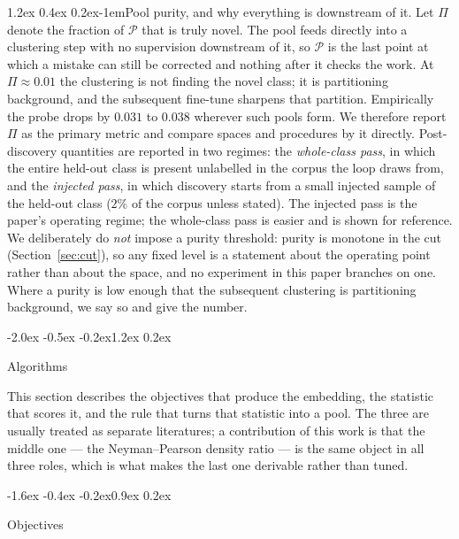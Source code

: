 \documentclass{article}
\makeatletter
\renewcommand\section{\@startsection{section}{1}{\z@}%
  {-2.0ex \@plus -0.5ex \@minus -0.2ex}{1.2ex \@plus 0.2ex}%
  {\large\bf\raggedright}}
\renewcommand\subsection{\@startsection{subsection}{2}{\z@}%
  {-1.6ex \@plus -0.4ex \@minus -0.2ex}{0.9ex \@plus 0.2ex}%
  {\normalsize\bf\raggedright}}
\renewcommand\paragraph{\@startsection{paragraph}{4}{\z@}%
  {1.2ex \@plus 0.4ex \@minus 0.2ex}{-1em}{\normalsize\bf}}
\newcommand{\pool}{\mathcal{P}}
\makeatother
\begin{document}
\paragraph{Pool purity, and why everything is downstream of it.}
Let $\Pi$ denote the fraction of $\pool$ that is truly novel. The pool feeds
directly into a clustering step with no supervision downstream of it, so
$\pool$ is the last point at which a mistake can still be corrected and
nothing after it checks the work. At $\Pi \approx 0.01$ the clustering is not
finding the novel class; it is partitioning background, and the subsequent
fine-tune sharpens that partition. Empirically the probe drops by $0.031$ to
$0.038$ wherever such pools form. We therefore report $\Pi$ as the primary
metric and compare spaces and procedures by it directly. Post-discovery
quantities are reported in two regimes: the \emph{whole-class pass}, in
which the entire held-out class is present unlabelled in the corpus the loop
draws from, and the \emph{injected pass}, in which discovery starts from a
small injected sample of the held-out class ($2\%$ of the corpus unless
stated). The injected pass is the paper's operating regime; the whole-class
pass is easier and is shown for reference. We deliberately do
\emph{not} impose a purity threshold: purity is monotone in the cut
(Section~\ref{sec:cut}), so any fixed level is a statement about the operating
point rather than about the space, and no experiment in this paper branches on
one. Where a purity is low enough that the subsequent clustering is
partitioning background, we say so and give the number.

\section{Algorithms}
\label{sec:algorithms}

This section describes the objectives that produce the embedding, the
statistic that scores it, and the rule that turns that statistic into a pool.
The three are usually treated as separate literatures; a contribution of this
work is that the middle one --- the Neyman--Pearson density ratio --- is the
same object in all three roles, which is what makes the last one derivable
rather than tuned.

\subsection{Objectives}
\end{document}
